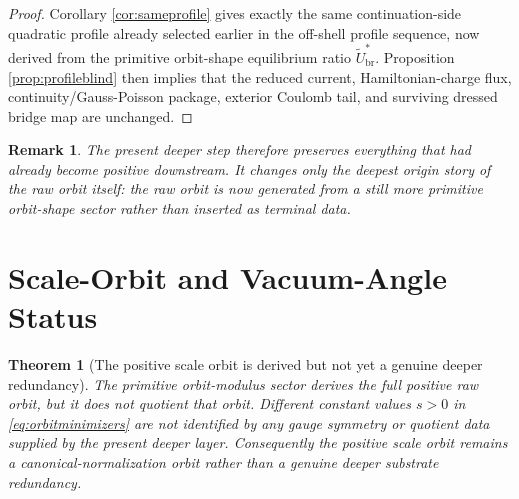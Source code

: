 \documentclass[11pt]{article}
\newcommand{\RespShapeEq}{\widetilde U_{\mathrm{br}}^{\ast}}
\newtheorem{remark}{Remark}
\newtheorem{theorem}{Theorem}
\begin{document}
\begin{proof}
Corollary \ref{cor:sameprofile} gives exactly the same continuation-side quadratic profile already selected earlier in the off-shell profile sequence, now derived from the primitive orbit-shape equilibrium ratio \(\RespShapeEq\). Proposition \ref{prop:profileblind} then implies that the reduced current, Hamiltonian-charge flux, continuity/Gauss-Poisson package, exterior Coulomb tail, and surviving dressed bridge map are unchanged.
\end{proof}

\begin{remark}
The present deeper step therefore preserves everything that had already become positive downstream. It changes only the deepest origin story of the raw orbit itself: the raw orbit is now generated from a still more primitive orbit-shape sector rather than inserted as terminal data.
\end{remark}

\section{Scale-Orbit and Vacuum-Angle Status}

\begin{theorem}[The positive scale orbit is derived but not yet a genuine deeper redundancy]
\label{thm:scalestatus}
The primitive orbit-modulus sector derives the full positive raw orbit, but it does not quotient that orbit. Different constant values \(s>0\) in \eqref{eq:orbitminimizers} are not identified by any gauge symmetry or quotient data supplied by the present deeper layer. Consequently the positive scale orbit remains a canonical-normalization orbit rather than a genuine deeper substrate redundancy.
\end{theorem}
\end{document}
